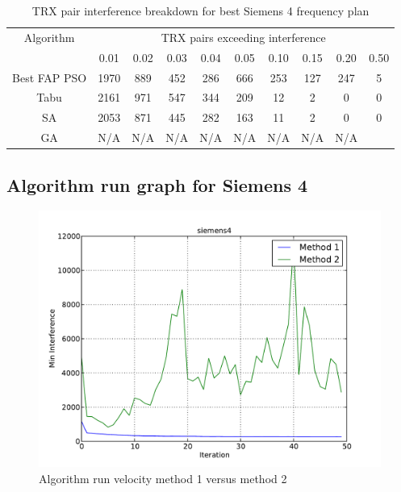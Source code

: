 \begin{table}[H]
\centering
	\begin{tabular}{cccccccccc}
	\toprule
    Algorithm & \multicolumn{9}{c}{TRX pairs exceeding interference}\\
    & 0.01 & 0.02 & 0.03 & 0.04 & 0.05 & 0.10 & 0.15 & 0.20 & 0.50 \\
    \midrule
    Best FAP PSO & 1970 & 889 & 452 & 286 & 666 & 253 & 127 & 247 & 5\\
    Tabu & 2161 & 971 & 547 & 344 & 209 & 12 & 2 & 0 & 0\\
    SA & 2053 & 871 & 445 & 282 & 163 & 11 & 2 & 0 & 0\\
    GA & \scriptsize{N/A} & \scriptsize{N/A} & \scriptsize{N/A} & \scriptsize{N/A} & \scriptsize{N/A} & \scriptsize{N/A} & \scriptsize{N/A} & \scriptsize{N/A}  \\
    \bottomrule
	\end{tabular}
\caption{TRX pair interference breakdown for best Siemens 4 frequency plan}
\label{tab:breakdown-siem4m1}
\end{table}
\subsection{Algorithm run graph for Siemens 4}
\begin{figure}[H]
	\begin{centering}
    \includegraphics[scale=0.5]{../Implementation/data-cruncher/graph/Siemens4.pdf}
	\caption{Algorithm run velocity method 1 versus method 2}
	\label{fig:siem4graph}
	\end{centering}
\end{figure}


